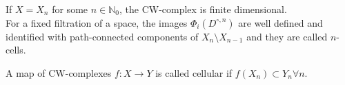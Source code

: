 \documentclass[../main.tex]{subfiles}
\begin{document}
\begin{rmq}
If $X=X_n$ for some $n\in \mathbb{N}_0$, the CW-complex is finite dimensional.\\
For a fixed filtration of a space, the images $\Phi_i( D^{\circ,n}) $ are well defined and identified with path-connected components of $X_n\setminus X_{n-1} $ and they are called $n$-cells.
\end{rmq}
\begin{defn}
	A map of CW-complexes $f:X\to Y$ is called cellular if $f( X_n) \subset Y_n\forall n$.
\end{defn}
\end{document}
